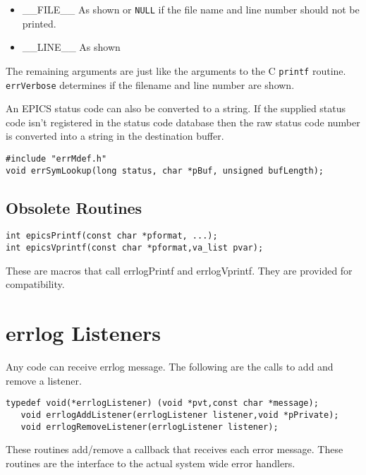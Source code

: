 \begin{itemize}\item \_\_FILE\_\_   As shown or \verb|NULL| if the file name and line number should not be printed.

\item \_\_LINE\_\_  As shown

\end{itemize}The remaining arguments are just like the arguments to the C \verb|printf| routine. \verb|errVerbose| determines if the filename 
and line number are shown.

An EPICS status code can also be converted to a string. If the supplied status code isn't registered in the status code 
database then the raw status code number is converted into a string in the destination buffer.

\begin{verbatim}#include "errMdef.h"
void errSymLookup(long status, char *pBuf, unsigned bufLength);
\end{verbatim}\subsection{Obsolete Routines }

\begin{verbatim}int epicsPrintf(const char *pformat, ...);
int epicsVprintf(const char *pformat,va_list pvar);
\end{verbatim}
These are macros that call errlogPrintf and errlogVprintf. They are provided for compatibility.

\section{errlog Listeners}

Any code can receive errlog message. The following are the calls to add and remove a listener.

\begin{verbatim}typedef void(*errlogListener) (void *pvt,const char *message);
   void errlogAddListener(errlogListener listener,void *pPrivate);
   void errlogRemoveListener(errlogListener listener);
\end{verbatim}
These routines add/remove a callback that receives each error message. These routines are the interface to the actual 
system wide error handlers.


